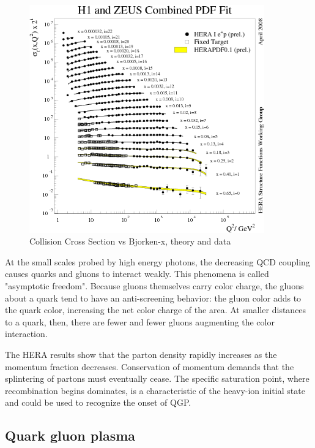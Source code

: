 \begin{figure}[h!]
\begin{centering}
\includegraphics[width=4in]{Chapter1/importfigs/scholarpedia_bjorken_x_qcdExp.png}
\par\end{centering}
\caption{Collision Cross Section vs Bjorken-x, theory and data \cite{Shimizu:2009fc} \label{fig:qcdBjorkenX}}
\end{figure}

At the small scales probed by high energy photons, the decreasing QCD coupling causes quarks and gluons to interact weakly. This phenomena is called "asymptotic freedom". Because gluons themselves carry color charge, the gluons about a quark tend to have an anti-screening behavior: the gluon color adds to the quark color, increasing the net color charge of the area. At smaller distances to a quark, then, there are fewer and fewer gluons augmenting the color interaction.

The HERA results show that the parton density rapidly increases as the momentum fraction decreases. Conservation of momentum demands that the splintering of partons must eventually cease. The specific saturation point, where recombination begins dominates, is a characteristic of the heavy-ion initial state  and could be used to recognize the onset of QGP. 

\subsection{Quark gluon plasma}


